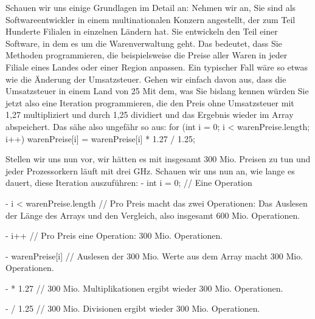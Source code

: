 Schauen wir uns einige Grundlagen im Detail an: Nehmen wir an, Sie sind als Softwareentwickler in einem multinationalen Konzern angestellt, der zum Teil Hunderte Filialen in einzelnen Ländern hat. Sie entwickeln den Teil einer Software, in dem es um die Warenverwaltung geht. Das bedeutet, dass Sie Methoden programmieren, die beispielsweise die Preise aller Waren in jeder Filiale eines Landes oder einer Region anpassen. Ein typischer Fall wäre so etwas wie die Änderung der Umsatzsteuer. Gehen wir einfach davon aus, dass die Umsatzsteuer in einem Land von 25%
Mit dem, was Sie bislang kennen würden Sie jetzt also eine Iteration programmieren, die den Preis ohne Umsatzsteuer mit 1,27 multipliziert und durch 1,25 dividiert und das Ergebnis wieder im Array abspeichert. Das sähe also ungefähr so aus:
for (int i = 0; i < warenPreise.length; i++) { warenPreise[i] = warenPreise[i] * 1.27 / 1.25; }

Stellen wir uns nun vor, wir hätten es mit insgesamt 300 Mio. Preisen zu tun und jeder Prozessorkern läuft mit drei GHz. Schauen wir uns nun an, wie lange es dauert, diese Iteration auszuführen:
-	int i = 0;		
// Eine Operation

-	i < warenPreise.length 	
// Pro Preis macht das zwei Operationen: Das Auslesen der Länge des Arrays und den Vergleich, also insgesamt 600 Mio. Operationen.

-	i++			
// Pro Preis eine Operation: 300 Mio. Operationen.

-	warenPreise[i]		
// Auslesen der 300 Mio. Werte aus dem Array macht 300 Mio. Operationen.

-	* 1.27			
// 300 Mio. Multiplikationen ergibt wieder 300 Mio. Operationen.

-	/ 1.25			
// 300 Mio. Divisionen ergibt wieder 300 Mio. Operationen.

